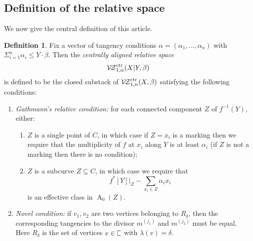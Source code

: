 \documentclass[11pt]{amsart}
\newcommand{\plC}{\scalebox{0.8}[1.3]{$\sqsubset$}}
\newcommand{\VZc}{{\mathcal{V\!Z}}^{\rm{ctr}}_{1,n}}
\newcommand{\VZcrel}{{\mathcal{V\!Z}}^{\rm{ctr}}_{1,\alpha}}
\newcommand{\Achow}{\operatorname{A}}
\theoremstyle{definition}
\theoremstyle{definition}
\newtheorem{dfn}[thm]{Definition}
\begin{document}
\subsection{Definition of the relative space} We now give the central definition of this article.
\begin{dfn}
Fix a vector of tangency conditions $\alpha=(\alpha_1,\ldots,\alpha_n)$ with $\Sigma_{i=1}^n \alpha_i \leq Y \cdot \beta$. Then the \emph{centrally aligned relative space} 
\begin{equation*}\VZcrel(X|Y,\beta) \end{equation*}
is defined to be the closed substack of $\VZc(X,\beta)$ satisfying the following conditions:
\begin{enumerate}
\item \emph{Gathmann's relative condition:} for each connected component $Z$ of $f^{-1}(Y)$, either:
\begin{enumerate}
\item $Z$ is a single point of $C$, in which case if $Z=x_i$ is a marking then we require that the multiplicity of $f$ at $x_i$ along $Y$ is at least $\alpha_i$ (if $Z$ is not a marking then there is no condition);
\item $Z$ is a subcurve $Z \subseteq C$, in which case we require that
\begin{equation*} f^*[Y]|_Z -\sum_{x_i\in Z}\alpha_ix_i\end{equation*}
is an effective class in $\Achow_0(Z)$.
\end{enumerate}

\item \emph{Novel condition:} if $v_1,v_2$ are two vertices belonging to $R_\delta$, then the corresponding tangencies to the divisor $m^{(j_1)}$ and $m^{(j_2)}$ must be equal. Here $R_\delta$ is the set of vertices $v \in \plC$ with $\lambda(v)=\delta$.
\end{enumerate}
\end{dfn}
\end{document}
